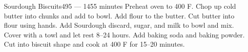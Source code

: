 \documentclass[../main.tex]{subfiles}
\begin{document}
\begin{recipe}{Sourdough Biscuits}{}{495 --- 1455 minutes}
    Preheat oven to 400\degrees{} F.
    Chop up cold butter into chunks and add to bowl.
    Add flour to the butter. Cut butter into flour using hands.
    Add Sourdough discard, sugar, and milk to bowl and mix. Cover with a towl and let rest 8--24 hours.
    Add baking soda and baking powder. Cut into biscuit shape and cook at 400\degrees{} F for 15--20 minutes.
\end{recipe}
\end{document}
